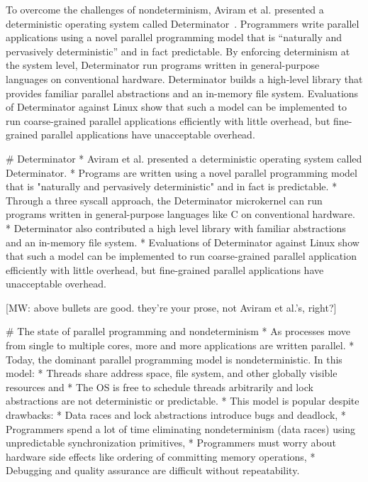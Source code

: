 To overcome the challenges of nondeterminism, Aviram et al. presented a
deterministic operating system called Determinator~\cite{Aviram10}.
Programmers write parallel applications using a novel parallel programming model
that is ``naturally and pervasively deterministic'' and in fact predictable.
By enforcing determinism at the system level, Determinator run programs written
in general-purpose languages on conventional hardware.
Determinator builds a high-level library that provides familiar parallel
abstractions and an in-memory file system.
Evaluations of Determinator against Linux show that such a model can be
implemented to run coarse-grained parallel applications efficiently with little
overhead, but fine-grained parallel applications have unacceptable overhead.

\iffalse
# Determinator
* Aviram et al. presented a deterministic operating system called Determinator.
* Programs are written using a novel parallel programming model that is
  "naturally and pervasively deterministic" and in fact is predictable.
* Through a three syscall approach, the Determinator microkernel can run
  programs written in general-purpose languages like C on conventional hardware.
* Determinator also contributed a high level library with familiar abstractions
  and an in-memory file system.
* Evaluations of Determinator against Linux show that such a model can be
  implemented to run coarse-grained parallel application efficiently with little
  overhead, but fine-grained parallel applications have unacceptable overhead.

  [MW: above bullets are good. they're your prose, not Aviram et al.'s, right?]

# The state of parallel programming and nondeterminism
* As processes move from single to multiple cores, more and more applications
  are written parallel.
* Today, the dominant parallel programming model is nondeterministic. In this
  model:
* Threads share address space, file system, and other globally visible
  resources and
* The OS is free to schedule threads arbitrarily and lock abstractions are not
  deterministic or predictable.
* This model is popular despite drawbacks:
* Data races and lock abstractions introduce bugs and deadlock,
* Programmers spend a lot of time eliminating nondeterminism (data races) using
  unpredictable synchronization primitives,
* Programmers must worry about hardware side effects like ordering of committing
  memory operations,
* Debugging and quality assurance are difficult without repeatability.

